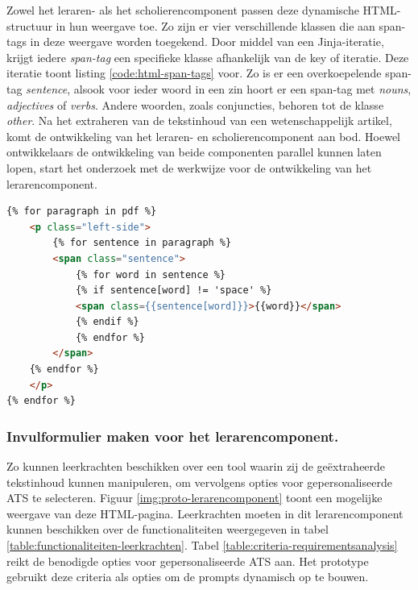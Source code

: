Zowel het leraren- als het scholierencomponent passen deze dynamische HTML-structuur in hun weergave toe. Zo zijn er vier verschillende klassen die aan span-tags in deze weergave worden toegekend. Door middel van een Jinja-iteratie, krijgt iedere \textit{span-tag} een specifieke klasse afhankelijk van de key of iteratie. Deze iteratie toont listing \ref{code:html-span-tags} voor. Zo is er een overkoepelende span-tag \textit{sentence}, alsook voor ieder woord in een zin hoort er een span-tag met \textit{nouns}, \textit{adjectives} of \textit{verbs}. Andere woorden, zoals conjuncties, behoren tot de klasse \textit{other}. Na het extraheren van de tekstinhoud van een wetenschappelijk artikel, komt de ontwikkeling van het leraren- en scholierencomponent aan bod. Hoewel ontwikkelaars de ontwikkeling van beide componenten parallel kunnen laten lopen, start het onderzoek met de werkwijze voor de ontwikkeling van het lerarencomponent.

\begin{lstlisting}[language=html, caption={Het doorlopen van de PDF-tekst op de webpagina en het toekennen van de span-tags.}, label={code:html-span-tags}]
{% for paragraph in pdf %}
	<p class="left-side">
		{% for sentence in paragraph %}
		<span class="sentence">
			{% for word in sentence %}
			{% if sentence[word] != 'space' %}
			<span class={{sentence[word]}}>{{word}}</span>
			{% endif %}
			{% endfor %}
		</span>
	{% endfor %}
	</p>
{% endfor %}
\end{lstlisting}


\subsubsection{Invulformulier maken voor het lerarencomponent.}

Zo kunnen leerkrachten beschikken over een tool waarin zij de geëxtraheerde tekstinhoud kunnen manipuleren, om vervolgens opties voor gepersonaliseerde ATS te selecteren. Figuur \ref{img:proto-lerarencomponent} toont een mogelijke weergave van deze HTML-pagina. Leerkrachten moeten in dit lerarencomponent kunnen beschikken over de functionaliteiten weergegeven in tabel \ref{table:functionaliteiten-leerkrachten}. Tabel \ref{table:criteria-requirementsanalysis} reikt de benodigde opties voor gepersonaliseerde ATS aan. Het prototype gebruikt deze criteria als opties om de prompts dynamisch op te bouwen.

